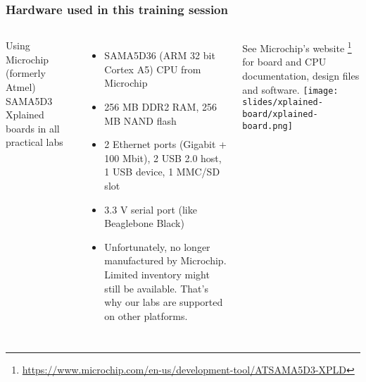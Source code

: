 \begin{frame}
\frametitle{Hardware used in this training session}
  \begin{columns}
    \footnotesize
    Using Microchip (formerly Atmel) SAMA5D3 Xplained boards in all practical labs
    \begin{itemize}
	\item SAMA5D36 (ARM 32 bit Cortex A5) CPU from Microchip
	\item 256 MB DDR2 RAM, 256 MB NAND flash
	\item 2 Ethernet ports (Gigabit + 100 Mbit), 2 USB 2.0 host, 1 USB device, 1 MMC/SD slot
	\item 3.3 V serial port (like Beaglebone Black)
	\item Unfortunately, no longer manufactured by Microchip.
              Limited inventory might still be available. That's why
	      our labs are supported on other platforms.
    \end{itemize}
    See Microchip's website
    \footnote{\tiny \url{https://www.microchip.com/en-us/development-tool/ATSAMA5D3-XPLD}}
    for board and CPU documentation, design files and software.
    \texttt{[image: slides/xplained-board/xplained-board.png]}
  \end{columns}
\end{frame}
